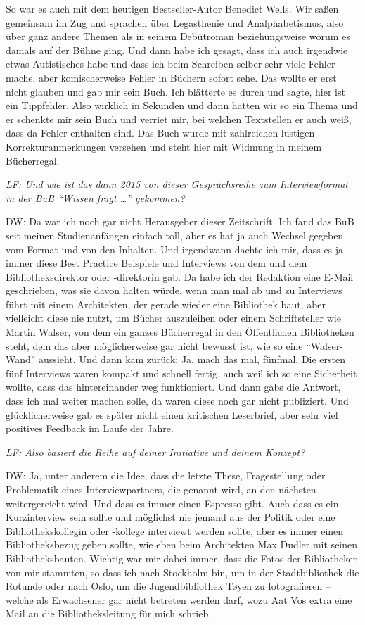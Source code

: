 \documentclass[a4paper,
fontsize=11pt,
oneside,
numbers=noperiodatend,
parskip=half-,
bibliography=totoc,
final
]{scrartcl}
\begin{document}
So war es auch mit dem heutigen Bestseller-Autor Benedict Wells. Wir
saßen gemeinsam im Zug und sprachen über Legasthenie und
Analphabetismus, also über ganz andere Themen als in seinem Debütroman
beziehungsweise worum es damals auf der Bühne ging. Und dann habe ich
gesagt, dass ich auch irgendwie etwas Autistisches habe und dass ich
beim Schreiben selber sehr viele Fehler mache, aber komischerweise
Fehler in Büchern sofort sehe. Das wollte er erst nicht glauben und gab
mir sein Buch. Ich blätterte es durch und sagte, hier ist ein
Tippfehler. Also wirklich in Sekunden und dann hatten wir so ein Thema
und er schenkte mir sein Buch und verriet mir, bei welchen Textstellen
er auch weiß, dass da Fehler enthalten sind. Das Buch wurde mit
zahlreichen lustigen Korrekturanmerkungen versehen und steht hier mit
Widmung in meinem Bücherregal.

\emph{LF: Und wie ist das dann 2015 von dieser Gesprächsreihe zum
Interviewformat in der BuB \enquote{Wissen fragt \ldots{}} gekommen?}

DW: Da war ich noch gar nicht Herausgeber dieser Zeitschrift. Ich fand
das BuB seit meinen Studienanfängen einfach toll, aber es hat ja auch
Wechsel gegeben vom Format und von den Inhalten. Und irgendwann dachte
ich mir, dass es ja immer diese Best Practice Beispiele und Interviews
von dem und dem Bibliotheksdirektor oder -direktorin gab. Da habe ich
der Redaktion eine E-Mail geschrieben, was sie davon halten würde, wenn
man mal ab und zu Interviews führt mit einem Architekten, der gerade
wieder eine Bibliothek baut, aber vielleicht diese nie nutzt, um Bücher
auszuleihen oder einem Schriftsteller wie Martin Walser, von dem ein
ganzes Bücherregal in den Öffentlichen Bibliotheken steht, dem das aber
möglicherweise gar nicht bewusst ist, wie so eine \enquote{Walser-Wand}
aussieht. Und dann kam zurück: Ja, mach das mal, fünfmal. Die ersten
fünf Interviews waren kompakt und schnell fertig, auch weil ich so eine
Sicherheit wollte, dass das hintereinander weg funktioniert. Und dann
gabs die Antwort, dass ich mal weiter machen solle, da waren diese noch
gar nicht publiziert. Und glücklicherweise gab es später nicht einen
kritischen Leserbrief, aber sehr viel positives Feedback im Laufe der
Jahre.

\emph{LF: Also basiert die Reihe auf deiner Initiative und deinem
Konzept?}

DW: Ja, unter anderem die Idee, dass die letzte These, Fragestellung
oder Problematik eines Interviewpartners, die genannt wird, an den
nächsten weitergereicht wird. Und dass es immer einen Espresso gibt.
Auch dass es ein Kurzinterview sein sollte und möglichst nie jemand aus der
Politik oder eine Bibliothekskollegin oder -kollege interviewt werden sollte, aber es immer
einen Bibliotheksbezug geben sollte, wie eben beim Architekten Max
Dudler mit seinen Bibliotheksbauten. Wichtig war mir dabei immer, dass die Fotos der Bibliotheken von
mir stammten, so dass ich nach Stockholm bin, um in der Stadtbibliothek
die Rotunde oder nach Oslo, um die Jugendbibliothek Tøyen zu
fotografieren -- welche als Erwachsener gar nicht betreten werden darf,
wozu Aat Vos extra eine Mail an die Bibliotheksleitung für mich schrieb.
\end{document}
